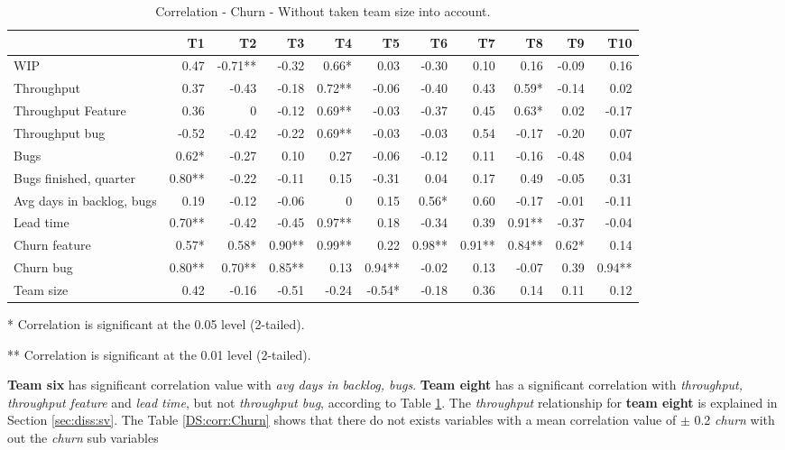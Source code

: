 \documentclass[UKenglish]{ifimaster}  %
\begin{document}
\begin{table}[!htbp]
 \begin{adjustwidth}{-2.5cm}{}
 \centering
 \begin{tabular}{|l|r|r|r|r|r|r|r|r|r|r|}
\hline
 & \bf{T1} & \bf{T2} & \bf{T3} & \bf{T4} & \bf{T5} & \bf{T6} & \bf{T7} & \bf{T8} & \bf{T9} & \bf{T10}\\ \hline
 WIP  & 0.47 & -0.71** & -0.32 & 0.66* & 0.03 & -0.30 & 0.10 & 0.16 & -0.09 & 0.16 \\ \hline
 Throughput  & 0.37 & -0.43 & -0.18 & 0.72** & -0.06 & -0.40 & 0.43 & 0.59* & -0.14 & 0.02 \\ \hline
 Throughput Feature  & 0.36 & 0 &-0.12 & 0.69** & -0.03 & -0.37 & 0.45 & 0.63* & 0.02 & -0.17 \\ \hline
 Throughput bug  & -0.52 & -0.42 & -0.22 & 0.69** & -0.03 & -0.03 & 0.54 & -0.17 & -0.20 & 0.07 \\ \hline
 Bugs  & 0.62* & -0.27 & 0.10 & 0.27 & -0.06 & -0.12 & 0.11 & -0.16 & -0.48 & 0.04 \\ \hline
 Bugs finished, quarter  & 0.80** & -0.22 & -0.11 & 0.15 & -0.31 & 0.04 & 0.17 & 0.49 & -0.05 & 0.31 \\ \hline
 Avg days in backlog, bugs  & 0.19 & -0.12 & -0.06 & 0 &0.15 & 0.56* & 0.60 & -0.17 & -0.01 & -0.11 \\ \hline
 Lead time  & 0.70** & -0.42 & -0.45 & 0.97** & 0.18 & -0.34 & 0.39 & 0.91** & -0.37 & -0.04 \\ \hline
 Churn feature  & 0.57* & 0.58* & 0.90** & 0.99** & 0.22 & 0.98** & 0.91** & 0.84** & 0.62* & 0.14 \\ \hline
 Churn bug  & 0.80** & 0.70** & 0.85** & 0.13 & 0.94** & -0.02 & 0.13 & -0.07 & 0.39 & 0.94** \\ \hline
 Team size  & 0.42 & -0.16 & -0.51 & -0.24 & -0.54* & -0.18 & 0.36 & 0.14 & 0.11 & 0.12 \\ \hline
\end{tabular}
 \caption{Correlation - Churn - Without taken team size into account.}
 \label{corr:churn}
 \centerline {* Correlation is significant at the 0.05 level (2-tailed).}
\centerline{** Correlation is significant at the 0.01 level (2-tailed).}
\end{adjustwidth}
\end{table}



\textbf{Team six} has significant correlation value with \textit{avg days in backlog, bugs}. \textbf{Team eight} has a significant correlation with \textit{throughput, throughput feature} and \textit{lead time}, but not \textit{throughput bug}, according to Table \ref{corr:churn}. The \textit{throughput} relationship for \textbf{team eight} is explained in Section \ref{sec:diss:sv}. The Table \ref{DS:corr:Churn} shows that there do not exists variables with a mean correlation value of $\pm$ 0.2 \textit{churn} with out the \textit{churn} sub variables 
\end{document}
